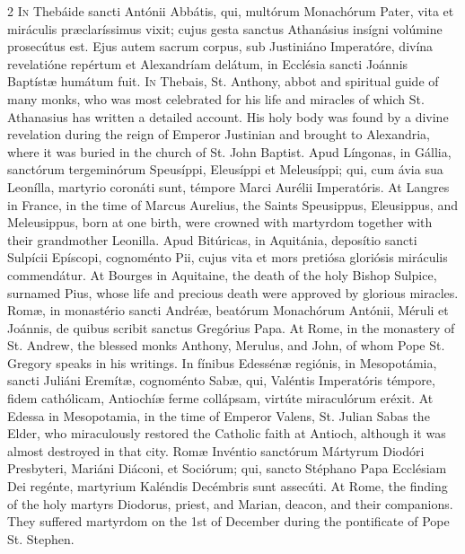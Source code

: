 \begin{paracol}{2}
\lettrine[lines=2]{I}{n} Thebáide sancti Antónii Abbátis, qui, multórum Monachórum Pater, vita et 
 miráculis præclaríssimus vixit; cujus gesta 
 sanctus Athanásius insígni volúmine prosecútus est. Ejus autem sacrum 
 corpus, sub Justiniáno Imperatóre, divína revelatióne repértum et 
 Alexandríam delátum, in Ecclésia sancti Joánnis Baptístæ humátum fuit.
\switchcolumn
{}
\lettrine[lines=2]{I}{n} Thebais, St. Anthony, abbot and spiritual guide of many monks, who was 
 most celebrated for his life and miracles of which St. Athanasius has 
 written a detailed account. His holy body was found by a divine 
 revelation during the reign of Emperor Justinian and brought to Alexandria, 
 where it was buried in the church of St. John Baptist.
\switchcolumn*
{}
Apud Língonas, in Gállia, sanctórum 
 tergeminórum Speusíppi, Eleusíppi et Meleusíppi; qui, cum ávia sua Leonílla, 
 martyrio coronáti sunt, témpore Marci Aurélii Imperatóris.
\switchcolumn
{}
At Langres in France, in the time of Marcus Aurelius, the Saints Speusippus, 
 Eleusippus, and Meleusippus, born at one birth, were crowned with martyrdom 
 together with their grandmother Leonilla.
\switchcolumn*
{}
Apud Bitúricas, in Aquitánia, deposítio sancti 
 Sulpícii Epíscopi, cognoménto Pii, cujus vita et mors pretiósa gloriósis 
 miráculis commendátur.
\switchcolumn
{}
At Bourges in Aquitaine, the death of the holy Bishop Sulpice, surnamed Pius, whose life 
 and precious death were approved by glorious miracles.
\switchcolumn*
{}
Romæ, in monastério sancti Andréæ, beatórum 
 Monachórum Antónii, Méruli et Joánnis, de quibus scribit sanctus Gregórius 
 Papa.
\switchcolumn
{}
At Rome, in the monastery of St. Andrew, the blessed monks Anthony, Merulus, 
 and John, of whom Pope St. Gregory speaks in his writings.
\switchcolumn*
{}
In fínibus Edessénæ regiónis, in Mesopotámia, sancti Juliáni Eremítæ, cognoménto Sabæ, qui, Valéntis Imperatóris témpore, 
 fidem cathólicam, Antiochíæ ferme collápsam, virtúte miraculórum eréxit.
\switchcolumn
{}
At Edessa in Mesopotamia, in the time of Emperor Valens, St. Julian Sabas 
 the Elder, who miraculously restored the Catholic faith at Antioch, although 
 it was almost destroyed in that city.
\switchcolumn*
{}
Romæ Invéntio sanctórum Mártyrum Diodóri 
 Presbyteri, Mariáni Diáconi, et Sociórum; qui, sancto Stéphano Papa 
 Ecclésiam Dei regénte, martyrium Kaléndis Decémbris sunt assecúti.
\switchcolumn
{}
At Rome, the finding of the holy martyrs Diodorus, priest, and Marian, 
 deacon, and their companions. They suffered martyrdom on the 1st of 
 December during the pontificate of Pope St. Stephen.
\switchcolumn*
{}
\end{paracol}


